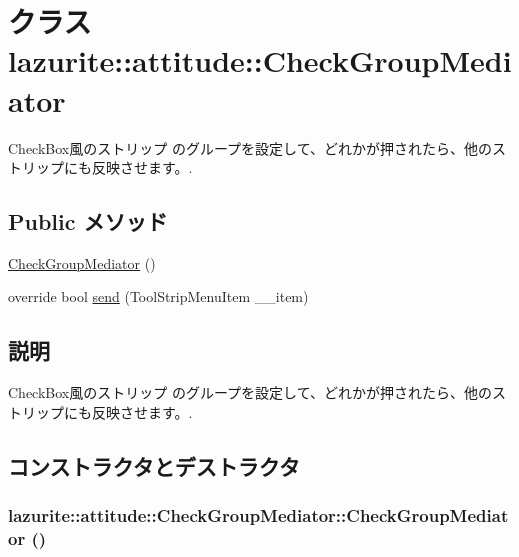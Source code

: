 \hypertarget{classlazurite_1_1attitude_1_1_check_group_mediator}{
\section{クラス lazurite::attitude::CheckGroupMediator}
\label{classlazurite_1_1attitude_1_1_check_group_mediator}
}


CheckBox風のストリップ のグループを設定して、どれかが押されたら、他のストリップにも反映させます。.  
\subsection*{Public メソッド}
\begin{DoxyCompactItemize}
\item 
\hyperlink{classlazurite_1_1attitude_1_1_check_group_mediator_a6070cd3080f32a2f8d7b3851c892619c}{CheckGroupMediator} ()
\item 
override bool \hyperlink{classlazurite_1_1attitude_1_1_check_group_mediator_a596352b6ebd534450a53065f9f689030}{send} (ToolStripMenuItem \_\-\_\-item)
\end{DoxyCompactItemize}


\subsection{説明}
CheckBox風のストリップ のグループを設定して、どれかが押されたら、他のストリップにも反映させます。. 

\subsection{コンストラクタとデストラクタ}
\hypertarget{classlazurite_1_1attitude_1_1_check_group_mediator_a6070cd3080f32a2f8d7b3851c892619c}{
\subsubsection[{CheckGroupMediator}]{\setlength{\rightskip}{0pt plus 5cm}lazurite::attitude::CheckGroupMediator::CheckGroupMediator ()}}
\label{classlazurite_1_1attitude_1_1_check_group_mediator_a6070cd3080f32a2f8d7b3851c892619c}



